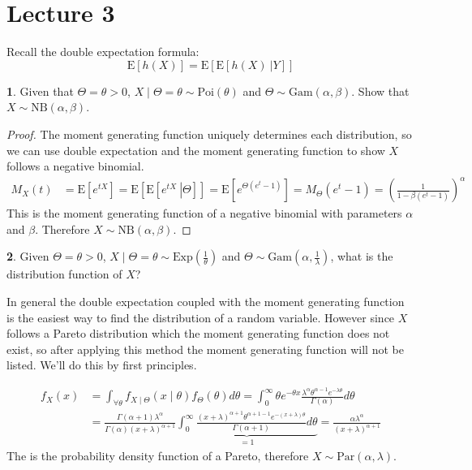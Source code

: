 \documentclass[english,12pt]{article}
\theoremstyle{plain}
\theoremstyle{definition}
\newtheorem*{example}{\protect\examplename}
\theoremstyle{definition} %
\providecommand{\examplename}{Example}
\newcommand{\ex}[1]{\mbox{E} \left[ #1 \right]}
\newcommand{\condex}[2]{\mbox{E} \left[ \left. #1 \ \right\vert \left. #2 \right. \right]}
\begin{document}
\section*{Lecture 3}
Recall the double expectation formula:
\[\ex{h(X)}=\ex{\condex{h(X)}{Y}}\]

\begin{example}
Given that $\Theta=\theta>0$, $X\mid\Theta=\theta\sim \text{Poi}(\theta)$ and $\Theta\sim \text{Gam}(\alpha,\beta)$.  Show that $X\sim \text{NB}(\alpha,\beta)$.
\end{example}

\begin{proof}
The moment generating function uniquely determines each distribution, so we can use double expectation and the moment generating function to show $X$ follows a negative binomial.
\begin{align*}
M_X(t)&=\ex{e^{tX}}
=\ex{\condex{e^{tX}}{\Theta}}
=\ex{e^{\Theta(e^t-1)}}
=M_\Theta(e^t-1)
=\left(\frac{1}{1-\beta(e^t-1)}\right)^\alpha
\end{align*}
This is the moment generating function of a negative binomial with parameters $\alpha$ and $\beta$.  Therefore $X\sim \text{NB}(\alpha,\beta)$.
\end{proof}

\begin{example}
Given $\Theta=\theta>0$, $X\mid\Theta=\theta\sim \text{Exp}\left(\frac{1}{\theta}\right)$ and $\Theta\sim \text{Gam}\left(\alpha,\frac{1}{\lambda}\right)$, what is the distribution function of $X$?

In general the double expectation coupled with the moment generating function is the easiest way to find the distribution of a random variable.  However since $X$ follows a Pareto distribution which the moment generating function does not exist, so after applying this method the moment generating function will not be listed.  We'll do this by first principles.

\begin{align*}
f_X(x)&=\int_{\forall\theta}f_{X\mid\Theta}(x\mid\theta)f_\Theta(\theta)d\theta
=\int_0^\infty \theta e^{-\theta x}\frac{\lambda^\alpha\theta^{\alpha-1}e^{-\lambda\theta}}{\Gamma(\alpha)}d\theta\\
&=\frac{\Gamma(\alpha+1)\lambda^\alpha}{\Gamma(\alpha)(x+\lambda)^{\alpha+1}}\underbrace{\int_0^\infty\frac{(x+\lambda)^{\alpha+1}\theta^{\alpha+1-1}e^{-(x+\lambda)\theta}}{\Gamma(\alpha+1)}d\theta}_{=1}
=\frac{\alpha\lambda^\alpha}{(x+\lambda)^{\alpha+1}}
\end{align*}
The is the probability density function of a Pareto, therefore $X\sim \text{Par}(\alpha,\lambda)$.
\end{example}
\end{document}
